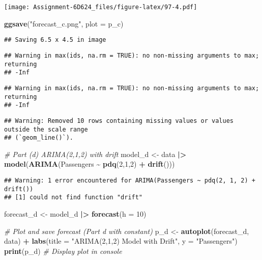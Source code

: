 \documentclass[
]{article}
\newenvironment{Shaded}{\begin{snugshade}}{\end{snugshade}}
\newcommand{\AttributeTok}[1]{\textcolor[rgb]{0.13,0.29,0.53}{#1}}
\newcommand{\CommentTok}[1]{\textcolor[rgb]{0.56,0.35,0.01}{\textit{#1}}}
\newcommand{\DecValTok}[1]{\textcolor[rgb]{0.00,0.00,0.81}{#1}}
\newcommand{\FunctionTok}[1]{\textcolor[rgb]{0.13,0.29,0.53}{\textbf{#1}}}
\newcommand{\NormalTok}[1]{#1}
\newcommand{\OtherTok}[1]{\textcolor[rgb]{0.56,0.35,0.01}{#1}}
\newcommand{\SpecialCharTok}[1]{\textcolor[rgb]{0.81,0.36,0.00}{\textbf{#1}}}
\newcommand{\StringTok}[1]{\textcolor[rgb]{0.31,0.60,0.02}{#1}}
\begin{document}
\texttt{[image: Assignment-6D624\_files/figure-latex/97-4.pdf]}

\begin{Shaded}
\begin{Highlighting}[]
\FunctionTok{ggsave}\NormalTok{(}\StringTok{"forecast\_c.png"}\NormalTok{, }\AttributeTok{plot =}\NormalTok{ p\_c)}
\end{Highlighting}
\end{Shaded}

\begin{verbatim}
## Saving 6.5 x 4.5 in image
\end{verbatim}

\begin{verbatim}
## Warning in max(ids, na.rm = TRUE): no non-missing arguments to max; returning
## -Inf
\end{verbatim}

\begin{verbatim}
## Warning in max(ids, na.rm = TRUE): no non-missing arguments to max; returning
## -Inf
\end{verbatim}

\begin{verbatim}
## Warning: Removed 10 rows containing missing values or values outside the scale range
## (`geom_line()`).
\end{verbatim}

\begin{Shaded}
\begin{Highlighting}[]
\CommentTok{\# Part (d) ARIMA(2,1,2) with drift}
\NormalTok{model\_d }\OtherTok{\textless{}{-}}\NormalTok{ data }\SpecialCharTok{|\textgreater{}} \FunctionTok{model}\NormalTok{(}\FunctionTok{ARIMA}\NormalTok{(Passengers }\SpecialCharTok{\textasciitilde{}} \FunctionTok{pdq}\NormalTok{(}\DecValTok{2}\NormalTok{,}\DecValTok{1}\NormalTok{,}\DecValTok{2}\NormalTok{) }\SpecialCharTok{+} \FunctionTok{drift}\NormalTok{()))}
\end{Highlighting}
\end{Shaded}

\begin{verbatim}
## Warning: 1 error encountered for ARIMA(Passengers ~ pdq(2, 1, 2) + drift())
## [1] could not find function "drift"
\end{verbatim}

\begin{Shaded}
\begin{Highlighting}[]
\NormalTok{forecast\_d }\OtherTok{\textless{}{-}}\NormalTok{ model\_d }\SpecialCharTok{|\textgreater{}} \FunctionTok{forecast}\NormalTok{(}\AttributeTok{h =} \DecValTok{10}\NormalTok{)}

\CommentTok{\# Plot and save forecast (Part d with constant)}
\NormalTok{p\_d }\OtherTok{\textless{}{-}} \FunctionTok{autoplot}\NormalTok{(forecast\_d, data) }\SpecialCharTok{+}
  \FunctionTok{labs}\NormalTok{(}\AttributeTok{title =} \StringTok{"ARIMA(2,1,2) Model with Drift"}\NormalTok{, }\AttributeTok{y =} \StringTok{"Passengers"}\NormalTok{)}
\FunctionTok{print}\NormalTok{(p\_d) }\CommentTok{\# Display plot in console}
\end{Highlighting}
\end{Shaded}
\end{document}
